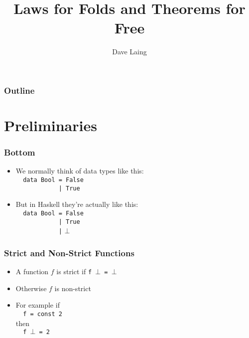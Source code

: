 \documentclass{beamer}
\title{Laws for Folds and Theorems for Free}
\author{Dave Laing}
\begin{document}
\begin{frame}
    \titlepage
\end{frame}

\begin{frame}
    \frametitle{Outline}
    \tableofcontents[pausesections]
\end{frame}

\section{Preliminaries}

\begin{frame}[fragile]
    \frametitle{Bottom}
\begin{itemize}
    \item<1-> We normally think of data types like this:\\
    \verb?  data Bool = False?\\
    \verb?            | True?\\
    \item<2-> But in Haskell they're actually like this:\\
    \verb?  data Bool = False?\\ 
    \verb?            | True?\\ 
    \verb?            |? $\bot$
\end{itemize}

\end{frame}

\begin{frame}[fragile]
    \frametitle{Strict and Non-Strict Functions}

\begin{itemize}
    \item A function $f$ is strict if \verb?f ?$\bot$\verb? = ?$\bot$
    \item Otherwise $f$ is non-strict
    \item For example if \\
    \verb?  f = const 2?\\ 
    then \\
    \verb?  f ?$\bot$\verb? = 2?
\end{itemize}

\end{frame}
\end{document}
